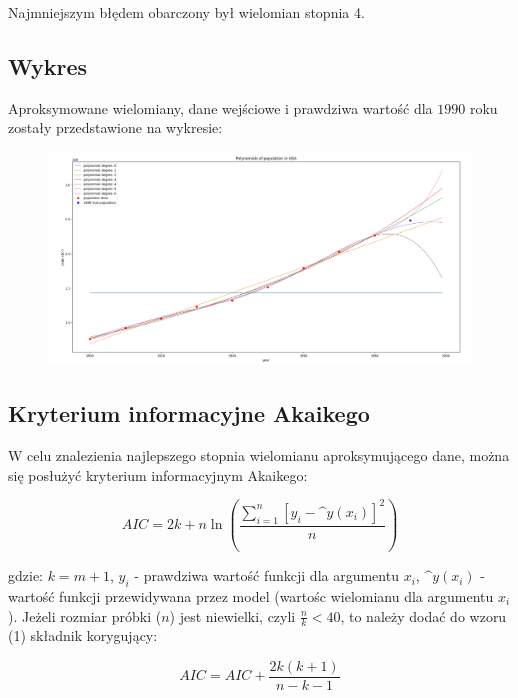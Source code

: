 \documentclass{article}
\begin{document}
	Najmniejszym błędem obarczony był wielomian stopnia 4. \\
	
	\subsection*{Wykres}	
	
	Aproksymowane wielomiany, dane wejściowe i prawdziwa wartość dla $1990$ roku zostały przedstawione na wykresie:
	
	
	\begin{figure}[h]
    		\centering
  		\includegraphics[scale = 0.3]{wykres1.png}
	\end{figure}
	
	\subsection*{Kryterium informacyjne Akaikego}
	
	W celu znalezienia najlepszego stopnia wielomianu aproksymującego dane, można się posłużyć kryterium informacyjnym Akaikego:
	
	\begin{equation}
		AIC = 2k + n \ln \left( \frac{\sum^n_{i=1} [y_i - \^y (x_i)]^2}{n} \right)
	\end{equation}
	
	gdzie: $k = m+1$, $y_i$ - prawdziwa wartość funkcji dla argumentu $x_i$, $\^y (x_i)$ - wartość funkcji przewidywana przez model (wartośc wielomianu dla argumentu $x_i$). Jeżeli rozmiar próbki ($n$) jest niewielki, czyli $\frac{n}{k} < 40$, to należy dodać do wzoru (1) składnik korygujący:
	
	\begin{equation}
		AIC = AIC + \frac{2k(k+1)}{n-k-1}
	\end{equation}
	
	\newpage	
	
\end{document}
